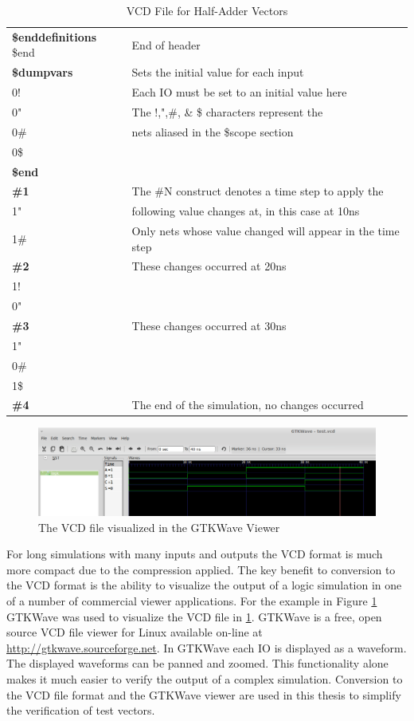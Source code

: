 \documentclass[12pt]{report}
\begin{document}
\begin{table}
\begin{center}
\begin{tabular}{l|l}
			\textbf{\$enddefinitions} \$end & End of header \\
			\textbf{\$dumpvars} & Sets the initial value for each input \\
			0!	& Each IO must be set to an initial value here \\
			0"	& The !,",\#, \& \$ characters represent the\\
			0\# & nets aliased in the \$scope section\\
			0\$ & \\
			\textbf{\$end} & \\
			\textbf{\#1} & The \#N construct denotes a time step to apply the \\
			1" & following value changes at, in this case at 10ns \\
			1\# & Only nets whose value changed will appear in the time step\\
			\textbf{\#2} & These changes occurred at 20ns \\ 
			1! & \\
			0" & \\
			\textbf{\#3} & These changes occurred at 30ns\\
			1" & \\
			0\# & \\
			1\$ & \\	
			\textbf{\#4} & The end of the simulation, no changes occurred \\		
		\end{tabular}
	\end{center}
	\caption{VCD File for Half-Adder Vectors}
	\label{tbl:half_adder_vcd}
\end{table} 
\begin{figure}
	\begin{center}
		\includegraphics[scale=.4]{images/half-adder-vcd}
	\end{center}
	\caption{The VCD file visualized in the GTKWave Viewer}
	\label{fig:half-adder-gtkwave}
\end{figure}
For long simulations with many inputs and outputs the VCD format is much more compact due to the compression applied.  The key benefit to conversion to the VCD format is the ability to visualize the output of a logic simulation in one of a number of commercial viewer applications.  For the example in Figure \ref{fig:half-adder-gtkwave} GTKWave was used to visualize the VCD file in \ref{tbl:half_adder_vcd}.  GTKWave is a free, open source VCD file viewer for Linux available on-line at \url{http://gtkwave.sourceforge.net}.  In GTKWave each IO is displayed as a waveform.  The displayed waveforms can be panned and zoomed.  This functionality alone makes it much easier to verify the output of a complex simulation.  Conversion to the VCD file format and the GTKWave viewer are used in this thesis to simplify the verification of test vectors.
\end{document}
